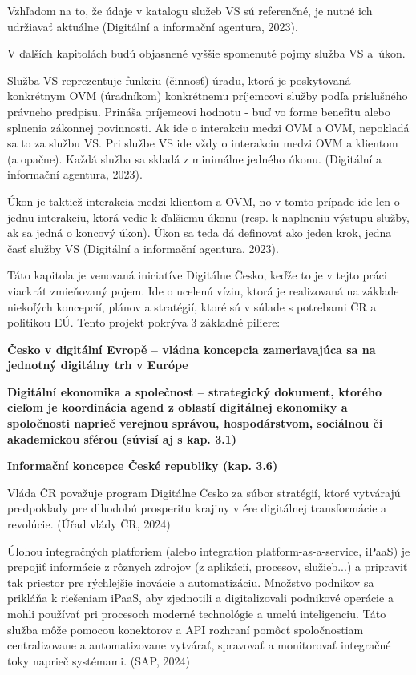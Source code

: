 Vzhľadom na to, že údaje v katalogu služeb VS sú referenčné, je nutné ich udržiavať aktuálne \scr(Digitální a informační agentura, 2023).

V ďalších kapitolách budú objasnené vyššie spomenuté pojmy služba VS a~úkon.

Služba VS reprezentuje funkciu (činnosť) úradu, ktorá je poskytovaná konkrétnym OVM (úradníkom) konkrétnemu príjemcovi služby podľa príslušného právneho predpisu. Prináša príjemcovi hodnotu - buď vo forme benefitu alebo splnenia zákonnej povinnosti. Ak ide o interakciu medzi OVM a OVM, nepokladá sa to za službu VS. Pri službe VS ide vždy o interakciu medzi OVM a klientom (a opačne). Každá služba sa skladá z minimálne jedného úkonu. \scr(Digitální a informační agentura, 2023).

Úkon je taktiež interakcia medzi klientom a OVM, no v tomto prípade ide len o jednu interakciu, ktorá vedie k ďalšiemu úkonu (resp. k naplneniu výstupu služby, ak sa jedná o koncový úkon). Úkon sa teda dá definovať ako jeden krok, jedna časť služby VS \scr(Digitální a informační agentura, 2023).

Táto kapitola je venovaná iniciatíve Digitálne Česko, keďže to je v tejto práci viackrát zmieňovaný pojem. Ide o ucelenú víziu, ktorá je realizovaná na základe niekoľých koncepcií, plánov a stratégií, ktoré sú v súlade s potrebami ČR a politikou EÚ. Tento projekt pokrýva 3 základné piliere:
\startitemize
\item{\start \bf Česko v digitální Evropě \stop -- vládna koncepcia zameriavajúca sa na jednotný digitálny trh v Európe} 
\item{\start \bf Digitální ekonomika a společnost \stop -- strategický dokument, ktorého cieľom je koordinácia agend z oblastí digitálnej ekonomiky a spoločnosti naprieč verejnou správou, hospodárstvom, sociálnou či akademickou sférou (súvisí aj s kap. 3.1)}
\item{\start \bf Informační koncepce České republiky \stop (kap. 3.6)}
\stopitemize

Vláda ČR považuje program Digitálne Česko za súbor stratégií, ktoré vytvárajú predpoklady pre dlhodobú prosperitu krajiny v ére digitálnej transformácie a revolúcie. (Úřad vlády ČR, 2024)


Úlohou integračných platforiem (alebo integration platform-as-a-service, \zlom iPaaS) je prepojiť informácie z rôznych zdrojov (z aplikácií, procesov, služieb...) a pripraviť tak priestor pre rýchlejšie inovácie a automatizáciu. Množstvo podnikov sa prikláňa k riešeniam iPaaS, aby zjednotili a digitalizovali podnikové operácie a mohli používať pri procesoch moderné technológie a umelú inteligenciu. Táto služba môže pomocou konektorov a API rozhraní pomôcť spoločnostiam centralizovane a automatizovane vytvárať, spravovať a monitorovať integračné toky naprieč systémami. \scr(SAP, 2024)

